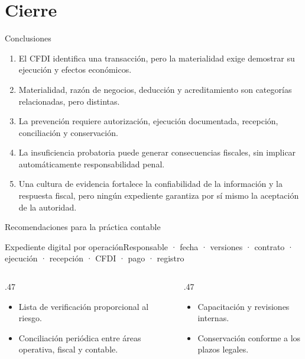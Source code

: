 \documentclass[spanish,aspectratio=169,xcolor={dvipsnames,table}]{beamer}
\begin{document}
\section{Cierre}
\begin{frame}{Conclusiones}
  \begin{enumerate}
    \item El CFDI identifica una transacción, pero la materialidad exige demostrar su ejecución y efectos económicos.
    \item Materialidad, razón de negocios, deducción y acreditamiento son categorías relacionadas, pero distintas.
    \item La prevención requiere autorización, ejecución documentada, recepción, conciliación y conservación.
    \item La insuficiencia probatoria puede generar consecuencias fiscales, sin implicar automáticamente responsabilidad penal.
    \item Una cultura de evidencia fortalece la confiabilidad de la información y la respuesta fiscal, pero ningún expediente garantiza por sí mismo la aceptación de la autoridad.
  \end{enumerate}
\end{frame}

\begin{frame}{Recomendaciones para la práctica contable}
  \begin{block}{Expediente digital por operación}\centering Responsable · fecha · versiones · contrato · ejecución · recepción · CFDI · pago · registro\end{block}
  \begin{columns}[T]
    \begin{column}{.47\textwidth}\begin{itemize}\item Lista de verificación proporcional al riesgo.\item Conciliación periódica entre áreas operativa, fiscal y contable.\end{itemize}\end{column}
    \begin{column}{.47\textwidth}\begin{itemize}\item Capacitación y revisiones internas.\item Conservación conforme a los plazos legales.\end{itemize}\end{column}
  \end{columns}
\end{frame}
\end{document}
